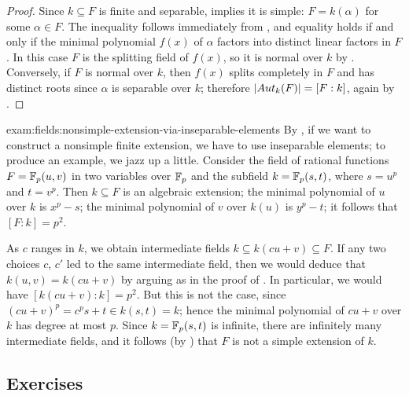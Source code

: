 \begin{proof}
  Since $k \subseteq F$ is finite and separable,
   implies it is simple: $F = k(\alpha)$ for
  some $\alpha \in F$. The inequality follows immediately from
  , and equality holds if and only if the
  minimal polynomial $f(x)$ of $\alpha$ factors into distinct linear
  factors in $F$. In this case $F$ is the splitting field of $f(x)$,
  so it is normal over $k$ by .  Conversely, if
  $F$ is normal over $k$, then $f(x)$ splits completely in $F$ and has
  distinct roots since $\alpha$ is separable over $k$; therefore
  $|Aut_k(F)| = [F : k]$, again by .
\end{proof}
\begin{exam}{}{exam:fields:nonsimple-extension-via-inseparable-elements}
  By , if we want to construct a nonsimple
  finite extension, we have to use inseparable elements; to produce an
  example, we jazz up  a little. Consider
  the field of rational functions $F = \mathbb{F}_p(u, v)$ in two variables
  over $\mathbb{F}_p$ and the subfield $k = \mathbb{F}_p(s, t)$, where $s = u^p$ and
  $t = v^p$. Then $k \subseteq F$ is an algebraic extension; the
  minimal polynomial of $u$ over $k$ is $x^p - s$; the minimal
  polynomial of $v$ over $k(u)$ is $y^p - t$; it follows that
  $[F : k] = p^2$.

  As $c$ ranges in $k$, we obtain intermediate fields
  $k \subseteq k(cu + v) \subseteq F$. If any two choices $c$, $c'$
  led to the same intermediate field, then we would deduce that
  $k(u, v) = k(cu+v)$ by arguing as in the proof of
  . In particular, we would have
  $[k(cu + v) : k] = p^2$. But this is not the case, since
  $(cu + v)^p = c^p s + t \in k(s, t) = k$; hence the minimal
  polynomial of $cu + v$ over $k$ has degree at most $p$. Since
  $k = \mathbb{F}_p(s, t)$ is infinite, there are infinitely many intermediate
  fields, and it follows (by ) that $F$ is not
  a simple extension of $k$.
\end{exam}

\subsection*{Exercises}

